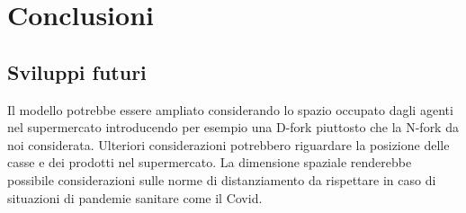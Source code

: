 \chapter{Conclusioni}

\section{Sviluppi futuri}

Il modello potrebbe essere ampliato considerando lo spazio occupato
dagli agenti nel supermercato introducendo per esempio una D-fork
\cite{yanagisawa2011methods} piuttosto che la N-fork da noi
considerata. Ulteriori considerazioni potrebbero riguardare la
posizione delle casse e dei prodotti nel supermercato. La dimensione
spaziale renderebbe possibile considerazioni sulle norme di
distanziamento da rispettare in caso di situazioni di pandemie
sanitare come il Covid.

